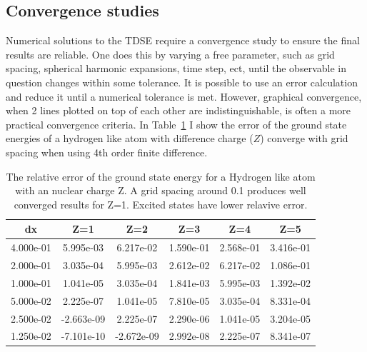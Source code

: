 \subsection{Convergence studies} %
\label{sub:convergence_studies}
Numerical solutions to the TDSE require a convergence study to ensure the final results are reliable. One does this by varying  a free parameter, such as grid spacing, spherical harmonic expansions, time step, ect, until the observable in question changes within some tolerance. It is possible to use an error calculation and reduce it until a numerical tolerance is met. However, graphical convergence, when 2 lines plotted on top of each other are indistinguishable, is often a more practical convergence criteria. In Table~\ref{tab:grid_spacing} I show the error of the ground state energies of a hydrogen like atom with difference charge ($Z$) converge with grid spacing when using 4th order finite difference.
\begin{table}[t]
\begin{center}
\begin{tabular}{|c|c|c|c|c|c|}
\hline
dx & Z=1 & Z=2 & Z=3 & Z=4 & Z=5 \\ \hline
4.000e-01 & 5.995e-03 & 6.217e-02 & 1.590e-01 & 2.568e-01 & 3.416e-01\\ \hline
2.000e-01 & 3.035e-04 & 5.995e-03 & 2.612e-02 & 6.217e-02 & 1.086e-01\\ \hline
1.000e-01 & 1.041e-05 & 3.035e-04 & 1.841e-03 & 5.995e-03 & 1.392e-02\\ \hline
5.000e-02 & 2.225e-07 & 1.041e-05 & 7.810e-05 & 3.035e-04 & 8.331e-04\\ \hline
2.500e-02 & -2.663e-09 & 2.225e-07 & 2.290e-06 & 1.041e-05 & 3.204e-05\\ \hline
1.250e-02 & -7.101e-10 & -2.672e-09 & 2.992e-08 & 2.225e-07 & 8.341e-07\\ \hline
\end{tabular}
\end{center}
  \caption{\label{tab:grid_spacing}The relative error of the ground state energy for a Hydrogen like atom with an nuclear charge Z. A grid spacing around 0.1 produces well converged results for Z=1. Excited states have lower relavive error.}
\end{table}

